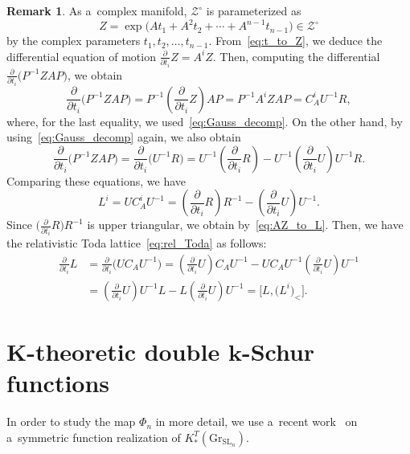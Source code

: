 \documentclass[pdftex]{sigma}
\numberwithin{equation}{section}
\newcommand{\Gr}{\mathrm{Gr}}
\newcommand{\SL}{\mathrm{SL}}
\theoremstyle{definition}
\newtheorem{Remark}[Theorem]{Remark}
\begin{document}
\begin{Remark}
As a~complex manifold, $\mathscr{Z}^\circ$ is parameterized as
\begin{equation}\label{eq:t_to_Z}
Z=\exp\bigl(
At_1+A^2t_2+\cdots+A^{n-1}t_{n-1}
\bigr)\in \mathscr{Z}^\circ
\end{equation}
by the complex parameters $t_1,t_2,\dots,t_{n-1}$.
From~\eqref{eq:t_to_Z}, we deduce the differential equation of motion $\frac{\partial }{\partial t_i}Z=A^iZ$.
Then, computing the differential $\frac{\partial}{\partial t_i}\bigl(P^{-1}ZAP\bigr)$, we obtain
\[
\frac{\partial}{\partial t_i}\bigl(P^{-1}ZAP\bigr)=P^{-1}\left(\frac{\partial}{\partial t_i}Z\right)AP=P^{-1}A^iZAP=
C_A^iU^{-1}R,
\]
where, for the last equality, we used~\eqref{eq:Gauss_decomp}.
On the other hand, by using~\eqref{eq:Gauss_decomp} again, we also obtain
\[
\frac{\partial}{\partial t_i}\bigl(P^{-1}ZAP\bigr)
=
\frac{\partial}{\partial t_i}\bigl(U^{-1}R\bigr)
=U^{-1}\left(\frac{\partial}{\partial t_i}R\right)-U^{-1}\left(\frac{\partial}{\partial t_i}U\right)U^{-1}R.
\]
Comparing these equations, we have
\[%
L^i=UC_A^iU^{-1}=
\left(\frac{\partial}{\partial t_i}R\right)R^{-1}-\left(\frac{\partial}{\partial t_i}U\right)U^{-1}.
\]
Since $\bigl(\frac{\partial}{\partial t_i}R\bigr)R^{-1}$ is upper triangular, we obtain  by~\eqref{eq:AZ_to_L}. Then, we have the relativistic Toda lattice~\eqref{eq:rel_Toda} as follows:
\begin{align*}%
\frac{\partial}{\partial t_i}L
&
=
\frac{\partial}{\partial t_i}\bigl(UC_AU^{-1}\bigr)=
\left(\frac{\partial}{\partial t_i}U\right)C_AU^{-1}-UC_AU^{-1}
\left(\frac{\partial}{\partial t_i}U\right)U^{-1}
\\
&=
\left(\frac{\partial}{\partial t_i}U\right)U^{-1}L-L
\left(\frac{\partial}{\partial t_i}U\right)U^{-1}=\big[L,\bigl(L^i\bigr)_{<}\big].
\end{align*}
\end{Remark}




\section[K-theoretic double k-Schur functions]{$\boldsymbol{K}$-theoretic double $\boldsymbol{k}$-Schur functions}\label{sec:Kk}
In order to study
the map $\Phi_n$
in more detail,
we use a~recent
work~\cite{ISY} on a~symmetric function realization
of $K_*^T(\Gr_{\SL_n})$.
\end{document}
